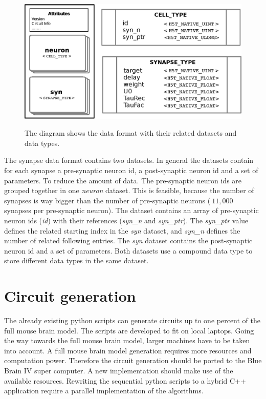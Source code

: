 \begin{figure}[ht!]
\begin{center}
{            \label{fig:oneProjection}
            \includegraphics[scale=0.41]{pictures/hdf5_syn_format.eps}
       }
    	   \end{center}
    	\caption{%
        The diagram shows the data format with their related datasets and data types.
     }%
   \label{fig:atlas}
   \end{figure}
   
The synapse data format contains two datasets. In general the datasets contain for each synapse
a pre-synaptic neuron id, a post-synaptic neuron id and a set of parameters. To reduce the amount of data.
The pre-synaptic neuron ids are grouped together in one \emph{neuron} dataset. This is feasible, because
the number of synapses is way bigger than the number of pre-synaptic neurons ($~11,000$ synapses per pre-synaptic neuron).
The dataset contains an array of  pre-synaptic neuron ids (\emph{id}) with their references (\emph{syn\_n} and \emph{syn\_ptr}).
The \emph{syn\_ptr} value defines the related starting index in the \emph{syn} dataset,
and \emph{syn\_n} defines the number of related following entries.
The \emph{syn} dataset contains the post-synaptic neuron id and a set of parameters.
Both datasets use a compound data type to store different data types in the same dataset.

\newpage
\section{Circuit generation}
The already existing python scripts can generate circuits up to one percent of the full mouse brain model.
The scripts are developed to fit on local laptops.
Going the way towards the full mouse brain model, larger machines have to be taken into account.
A full mouse brain model generation requires more resources and computation power.
Therefore the circuit generation should be ported to the Blue Brain IV super computer.
A new implementation should make use of the available resources.
Rewriting the sequential python scripts to a hybrid C++ application require a parallel implementation of the algorithms.


